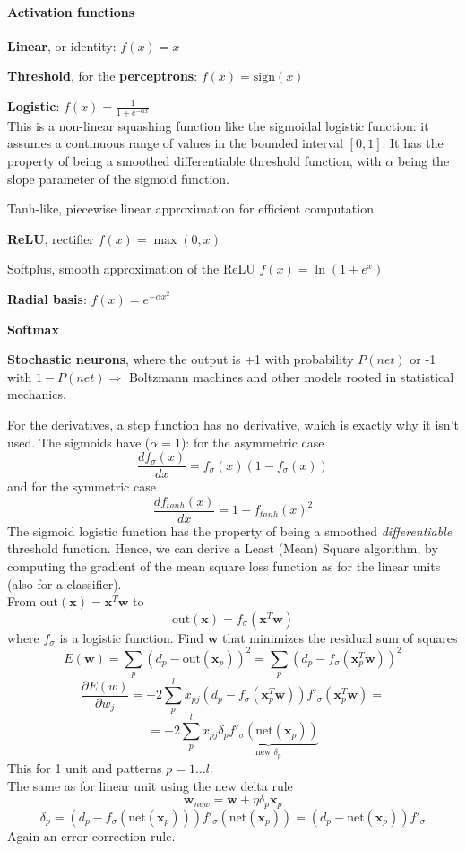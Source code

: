 \documentclass[10pt]{report}
\begin{document}
\paragraph{Activation functions}
\begin{list}{}{}
	\item \textbf{Linear}, or identity: $f(x) = x$
	\item \textbf{Threshold}, for the \textbf{perceptrons}: $f(x) = \text{sign}(x)$
	\item \textbf{Logistic}: $f(x) = \frac{1}{\displaystyle 1 + e^{-\alpha x}}$\\
	This is a non-linear squashing function like the sigmoidal logistic function: it assumes a continuous range of values in the bounded interval $[0,1]$. It has the property of being a smoothed differentiable threshold function, with $\alpha$ being the slope parameter of the sigmoid function.
	\item Tanh-like, piecewise linear approximation for efficient computation
	\item \textbf{ReLU}, rectifier $f(x)=\max(0, x)$
	\item Softplus, smooth approximation of the ReLU $f(x)=\ln(1+e^x)$
	\item \textbf{Radial basis}: $f(x) = e^{-\alpha x^2}$
	\item \textbf{Softmax}
	\item \textbf{Stochastic neurons}, where the output is +1 with probability $P(net)$ or -1 with $1-P(net) \Rightarrow$ Boltzmann machines and other models rooted in statistical mechanics.
\end{list}
For the derivatives, a step function has no derivative, which is exactly why it isn't used. The sigmoids have ($\alpha = 1$): for the asymmetric case $$\frac{df_\sigma(x)}{dx} = f_\sigma(x) (1-f_\sigma(x))$$ and for the symmetric case $$\frac{df_{tanh}(x)}{dx} = 1 - f_{tanh}(x)^2$$ 
The sigmoid logistic function has the property of being a smoothed \textit{differentiable} threshold function. Hence, we can derive a Least (Mean) Square algorithm, by computing the gradient of the mean square loss function as for the linear units (also for a classifier).\\
From $\text{out}(\mathbf{x}) = \mathbf{x}^T\mathbf{w}$ to $$\text{out}(\mathbf{x}) = f_\sigma(\mathbf{x}^T\mathbf{w})$$ where $f_\sigma$ is a logistic function. Find $\mathbf{w}$ that minimizes the residual sum of squares $$E(\mathbf{w}) = \sum_p (d_p - \text{out}(\mathbf{x}_p))^2 = \sum_p (d_p - f_\sigma(\mathbf{x}_p^T\mathbf{w}))^2$$
$$\frac{\partial E(w)}{\partial w_j} = -2\sum_p^l x_{pj} (d_p - f_\sigma(\mathbf{x}_p^T\mathbf{w}))f'_\sigma(\mathbf{x}_p^T\mathbf{w}) =$$ $$= -2\sum_p^lx_{pj}\underset{\text{new }\delta_p}{\underbrace{\delta_pf'_\sigma(\text{net}(\mathbf{x}_p))}}$$
This for 1 unit and patterns $p = 1\ldots l$.\\
The same as for linear unit using the new delta rule
$$\mathbf{w}_{new}=\mathbf{w}+\eta\delta_p\mathbf{x}_p$$
$$\delta_p = (d_p - f_\sigma(\text{net}(\mathbf{x}_p)))f'_\sigma(\text{net}(\mathbf{x}_p)) = (d_p-\text{net}(\mathbf{x}_p))f'_\sigma$$
Again an error correction rule.
\end{document}
